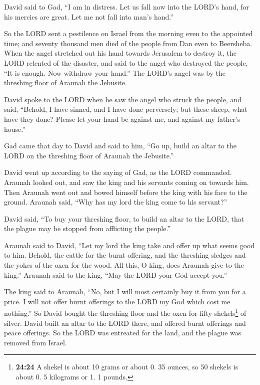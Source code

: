  David said to Gad, ``I am in distress. Let us fall now
into the LORD's hand, for his mercies are great. Let me not fall into
man's hand.''

 So the LORD sent a pestilence on Israel from the morning
even to the appointed time; and seventy thousand men died of the people
from Dan even to Beersheba.  When the angel stretched out
his hand towards Jerusalem to destroy it, the LORD relented of the
disaster, and said to the angel who destroyed the people, ``It is
enough. Now withdraw your hand.'' The LORD's angel was by the threshing
floor of Araunah the Jebusite.

 David spoke to the LORD when he saw the angel who struck
the people, and said, ``Behold, I have sinned, and I have done
perversely; but these sheep, what have they done? Please let your hand
be against me, and against my father's house.''

 Gad came that day to David and said to him, ``Go up,
build an altar to the LORD on the threshing floor of Araunah the
Jebusite.''

 David went up according to the saying of Gad, as the
LORD commanded.  Araunah looked out, and saw the king and
his servants coming on towards him. Then Araunah went out and bowed
himself before the king with his face to the ground. 
Araunah said, ``Why has my lord the king come to his servant?''

David said, ``To buy your threshing floor, to build an altar to the
LORD, that the plague may be stopped from afflicting the people.''

 Araunah said to David, ``Let my lord the king take and
offer up what seems good to him. Behold, the cattle for the burnt
offering, and the threshing sledges and the yokes of the oxen for the
wood.  All this, O king, does Araunah give to the king.''
Araunah said to the king, ``May the LORD your God accept you.''

 The king said to Araunah, ``No, but I will most
certainly buy it from you for a price. I will not offer burnt offerings
to the LORD my God which cost me nothing.'' So David bought the
threshing floor and the oxen for fifty shekels\footnote{\textbf{24:24} A
  shekel is about 10 grams or about 0. 35 ounces, so 50 shekels is about
  0. 5 kilograms or 1. 1 pounds.} of silver.  David built
an altar to the LORD there, and offered burnt offerings and peace
offerings. So the LORD was entreated for the land, and the plague was
removed from Israel.
